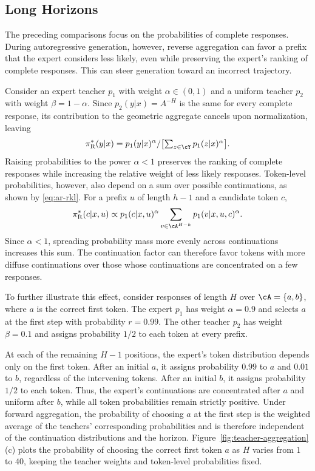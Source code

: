\documentclass[11pt]{article}
\newcommand{\pir}{\pi_{\mathrm{R}}}
\begin{document}
\subsection{Long Horizons}
The preceding comparisons focus on the probabilities of complete responses. During autoregressive generation, however, reverse aggregation can favor a prefix that the expert considers less likely, even while preserving the expert's ranking of complete responses. This can steer generation toward an incorrect trajectory.

Consider an expert teacher $p_1$ with weight $\alpha\in(0,1)$ and a uniform teacher $p_2$ with weight $\beta=1-\alpha$. Since $p_2(y|x)=A^{-H}$ is the same for every complete response, its contribution to the geometric aggregate cancels upon normalization, leaving
\begin{align}
    \pir^*(y|x)
    ={p_1(y|x)^\alpha}/\big[{\textstyle\sum_{z\in\cY}p_1(z|x)^\alpha}\big].
    \notag
\end{align}
Raising probabilities to the power $\alpha<1$ preserves the ranking of complete responses while increasing the relative weight of less likely responses. Token-level probabilities, however, also depend on a sum over possible continuations, as shown by \eqref{eq:ar-rkl}. For a prefix $u$ of length $h-1$ and a candidate token $c$,
\begin{align}
    \pir^*(c|x,u)
    \propto p_1(c|x,u)^\alpha
    \sum_{v\in\cA^{H-h}}p_1(v|x,u,c)^\alpha.
    \notag
\end{align}
Since $\alpha<1$, spreading probability mass more evenly across continuations increases this sum. The continuation factor can therefore favor tokens with more diffuse continuations over those whose continuations are concentrated on a few responses.

To further illustrate this effect, consider responses of length $H$ over $\cA=\{a,b\}$, where $a$ is the correct first token. The expert $p_1$ has weight $\alpha=0.9$ and selects $a$ at the first step with probability $r=0.99$. The other teacher $p_2$ has weight $\beta=0.1$ and assigns probability $1/2$ to each token at every prefix.

At each of the remaining $H-1$ positions, the expert's token distribution depends only on the first token. After an initial $a$, it assigns probability $0.99$ to $a$ and $0.01$ to $b$, regardless of the intervening tokens. After an initial $b$, it assigns probability $1/2$ to each token. Thus, the expert's continuations are concentrated after $a$ and uniform after $b$, while all token probabilities remain strictly positive. Under forward aggregation, the probability of choosing $a$ at the first step is the weighted average of the teachers' corresponding probabilities and is therefore independent of the continuation distributions and the horizon. Figure~\ref{fig:teacher-aggregation}(c) plots the probability of choosing the correct first token $a$ as $H$ varies from $1$ to $40$, keeping the teacher weights and token-level probabilities fixed.
\end{document}

